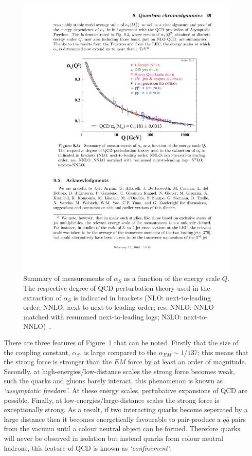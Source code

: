 \begin{figure}[!hbt]
  \begin{center}
    \includegraphics[width=0.7\linewidth, angle=0]{figs/Theory/qcd_running.pdf}
  \end{center}
  \caption[Summary of measurements of $\alpha_S$ as a function of the energy scale $Q$.
    The respective degree of QCD perturbation theory used in the extraction of $\alpha_S$ is indicated in brackets
    (NLO: next-to-leading order; NNLO: next-to-next-to leading order; res. NNLO: NNLO matched with resummed next-to-leading logs; N3LO: next-to-NNLO).]
          {Summary of measurements of $\alpha_S$ as a function of the energy scale $Q$.
            The respective degree of QCD perturbation theory used in the extraction of $\alpha_S$ is indicated in brackets
            (NLO: next-to-leading order; NNLO: next-to-next-to leading order; res. NNLO: NNLO matched with resummed next-to-leading logs; N3LO: next-to-NNLO)~\cite{theo-qcd}.}
  \label{fig:theo-qcd_running}
\end{figure}

There are three features of Figure~\ref{fig:theo-qcd_running} that can be noted.
Firstly that the size of the coupling constant, $\alpha_S$, is large compared to the
$\alpha_{EM} \sim 1/137$;
this means that the strong force is stronger than the $EM$ force by at least an order of magnitude.
Secondly, at high-energies/low-distance scales the strong force becomes weak, such the quarks and gluons barely interact, this phenomenon is known as
\textit{`assymptotic freedom'}.
At these energy scales, pertubative expansions of QCD are possible.
Finally, at low-energies/large-distance scales the strong force is exceptionally strong.
As a result, if two interacting quarks become seperated by a large distance then it becomes energetically favourable to
pair-produce a $q\bar{q}$ pairs from the vacuum until a colour neutral object can be formed.
Therefore quarks will never be observed in isolation but instead quarks form colour neutral hadrons, this feature of QCD is known as \textit{`confinement'}.

